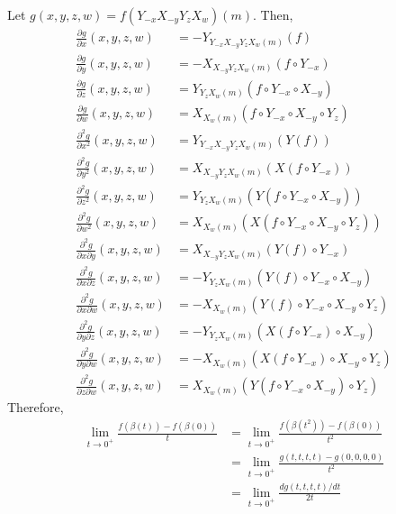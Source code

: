 \begin{enumerate}
Let $g(x, y, z, w)=f(Y_{-x} X_{-y} Y_{z} X_{w})(m)$. Then,
\begin{align*}
\frac{\partial g}{\partial x}(x, y, z, w) & =-Y_{Y_{-x} X_{-y} Y_{z} X_{w}(m)}(f) \\
\frac{\partial g}{\partial y}(x, y, z, w) & =-X_{X_{-y} Y_{z} X_{w}(m)}(f \circ Y_{-x}) \\
\frac{\partial g}{\partial z}(x, y, z, w) & =Y_{Y_{z} X_{w}(m)}(f \circ Y_{-x} \circ X_{-y}) \\
\frac{\partial g}{\partial w}(x, y, z, w) & =X_{X_{w}(m)}(f \circ Y_{-x} \circ X_{-y} \circ Y_{z}) \\
\frac{\partial^{2} g}{\partial x^{2}}(x, y, z, w) & =Y_{Y_{-x} X_{-y} Y_{z} X_{w}(m)}(Y(f)) \\
\frac{\partial^{2} g}{\partial y^{2}}(x, y, z, w) & =X_{X_{-y} Y_{z} X_{w}(m)}(X(f \circ Y_{-x})) \\
\frac{\partial^{2} g}{\partial z^{2}}(x, y, z, w) & =Y_{Y_{z} X_{w}(m)}(Y(f \circ Y_{-x} \circ X_{-y})) \\
\frac{\partial^{2} g}{\partial w^{2}}(x, y, z, w) & =X_{X_{w}(m)}(X(f \circ Y_{-x} \circ X_{-y} \circ Y_{z})) \\
\frac{\partial^{2} g}{\partial x \partial y}(x, y, z, w) & =X_{X_{-y} Y_{z} X_{w}(m)}(Y(f) \circ Y_{-x}) \\
\frac{\partial^{2} g}{\partial x \partial z}(x, y, z, w) & =-Y_{Y_{z} X_{w}(m)}(Y(f) \circ Y_{-x} \circ X_{-y}) \\
\frac{\partial^{2} g}{\partial x \partial w}(x, y, z, w) & =-X_{X_{w}(m)}(Y(f) \circ Y_{-x} \circ X_{-y} \circ Y_{z}) \\
\frac{\partial^{2} g}{\partial y \partial z}(x, y, z, w) & =-Y_{Y_{z} X_{w}(m)}(X(f \circ Y_{-x}) \circ X_{-y}) \\
\frac{\partial^{2} g}{\partial y \partial w}(x, y, z, w) & =-X_{X_{w}(m)}(X(f \circ Y_{-x}) \circ X_{-y} \circ Y_{z}) \\
\frac{\partial^{2} g}{\partial z \partial w}(x, y, z, w) & =X_{X_{w}(m)}(Y(f \circ Y_{-x} \circ X_{-y}) \circ Y_{z})
\end{align*}
Therefore,
\begin{align*}
\lim_{t \rightarrow 0^{+}} \frac{f(\beta(t))-f(\beta(0))}{t} & = \lim_{t \rightarrow 0^{+}} \frac{f(\beta(t^{2}))-f(\beta(0))}{t^{2}} \\
& = \lim_{t \rightarrow 0^{+}} \frac{g(t, t, t, t)-g(0,0,0,0)}{t^{2}} \\
& = \lim_{t \rightarrow 0^{+}} \frac{d g(t, t, t, t) / d t}{2t} \\

\end{align*}
\end{enumerate}

